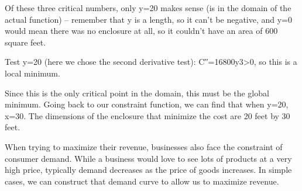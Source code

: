 \begin{example}
\begin{solution}
Of these three critical numbers, only y=20 makes sense (is in the domain of the actual function) – remember that y is a length, so it can’t be negative, and y=0 would mean there was no enclosure at all, so it couldn't have an area of 600 square feet.

Test y=20 (here we chose the second derivative test):
C′′=16800y3>0,
so this is a local minimum.

Since this is the only critical point in the domain, this must be the global minimum. Going back to our constraint function, we can find that when y=20, x=30. The dimensions of the enclosure that minimize the cost are 20 feet by 30 feet.
\end{solution}\end{example}

When trying to maximize their revenue, businesses also face the constraint of consumer demand. While a business would love to see lots of products at a very high price, typically demand decreases as the price of goods increases. In simple cases, we can construct that demand curve to allow us to maximize revenue.

